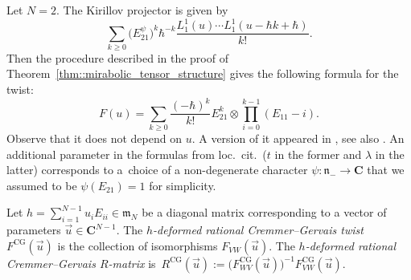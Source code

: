 \documentclass[10pt,a4paper]{amsart}
\numberwithin{equation}{section}
\newcommand{\CG}{\mathrm{CG}}
\newcommand{\C}{\mathbf{C}}
\newcommand{\n}{\mathfrak{n}}
\newcommand{\m}{\mathfrak{m}}
\begin{document}
	\begin{Example}
		Let $N=2$. The Kirillov projector is given by
		\[
		\sum\limits_{k\geq 0} \bigl(E_{21}^{\psi}\bigr)^k \hbar^{-k} \frac{L_1^1(u) \cdots L_1^1(u-\hbar k + \hbar)}{k!}.
		\]
		Then the procedure described in the proof of Theorem~\ref{thm::mirabolic_tensor_structure} gives the following formula for the twist:
		\begin{equation}
			\label{eq::cg_twist_gl2}
			F(u)= \sum\limits_{k\geq 0} \frac{(-\hbar)^k}{k!} E_{21}^k \otimes \prod_{i=0}^{k-1} (E_{11} - i).
		\end{equation}
		Observe that it does not depend on $u$. A version of it appeared in \cite{GerstenhaberGiaquintoSchack}, see also \cite{KhoroshkinStolinTolstoy}. An additional parameter in the formulas from loc.\ cit.\  ($t$ in the former and $\lambda$ in the latter) corresponds to a~choice of a non-degenerate character $\psi\colon \n_- \rightarrow \C$ that we assumed to be $\psi(E_{21})=1$ for simplicity.
	\end{Example}
	
	\begin{Definition}
		\label{def::cremmer_gervais}
		Let $h = \sum_{i=1}^{N-1} u_i E_{ii} \in \m_N$ be a diagonal matrix corresponding to a vector of parameters $\vec{u} \in \C^{N-1}$. The $h$\emph{-deformed rational Cremmer--Gervais twist} $F^{\CG}(\vec{u})$ is the collection of isomorphisms $F_{VW}(\vec{u})$. The $h$\emph{-deformed rational Cremmer--Gervais $R$-matrix} is~$R^{\CG}(\vec{u}):= \bigl(F_{WV}^{\CG}(\vec{u})\bigr)^{-1} F_{VW}^{\CG}(\vec{u})$.
	\end{Definition}
	
\end{document}
